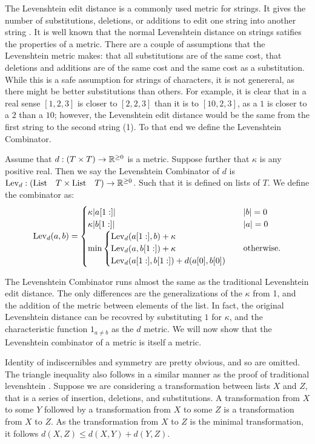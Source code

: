 The Levenshtein edit distance is a commonly used metric for strings.
It gives the number of substitutions, deletions, or additions to edit one string into another string \cite{wiki:levenshtein}.
It is well known that the normal Levenshtein distance on strings satifies the properties of a metric.
There are a couple of assumptions that the Levenshtein metric makes:
that all substitutions are of the same cost,
that deletions and additions are of the same cost and the same cost as a substitution.
While this is a safe assumption for strings of characters,
it is not genereral, as there might be better substitutions than others.
For example, 
it is clear that in a real sense $[1, 2, 3]$ is closer to $[2, 2, 3]$ than it is to $[10, 2, 3]$,
as a $1$ is closer to a $2$ than a $10$;
however, the Levenshtein edit distance would be the same from the first string to the second string (1).
To that end we define the Levenshtein Combinator.

\begin{definition}
Assume that $d : (T \times T) \to \mathbb{R}^{\ge 0}$ is a metric.
Suppose further that $\kappa$ is any positive real.
Then we say the Levenshtein Combinator of $d$ is  $\text{Lev}_{d} : (\text{List}\quad T \times \text{List}\quad T) \to \mathbb{R}^{\ge 0}$.
Such that it is defined on lists of $T$.
We define the combinator as: 
$$ \lev{d}(a, b) = \begin{cases} 
    \kappa | \tail{a} | & |b| = 0 \\
    \kappa | \tail{b} | & |a| = 0 \\ 
    \text{min} \begin{cases}
        \lev{d}(\tail{a}, b) + \kappa \\
        \lev{d}(a, \tail{b}) + \kappa \\
        \lev{d}(\tail{a}, \tail{b}) + d(\head{a}, \head{b})  %
    \end{cases} & \otw
\end{cases}$$
\end{definition}

The Levenshtein Combinator runs almost the same as the traditional Levenshtein edit distance.
The only differences are the generalizations of the $\kappa$ from 1,
and the addition of the metric between elements of the list.
In fact, the original Levenshtein distance can be recovred by substituting $1$ for $\kappa$,
and the characteristic function $1_{a \neq b}$ as the $d$ metric.
We will now show that the Levenshtein combinator of a metric is itself a metric. 

Identity of indiscernibles and symmetry are pretty obvious, and so are omitted.
The triangle inequality also follows in a similar manner as the proof of traditional levenshtein \cite{j2kun_2014}.
Suppose we are considering a transformation between lists $X$ and $Z$,
that is a series of insertion, deletions, and substitutions.
A transformation from $X$ to some $Y$ followed by a transformation from $X$ to some $Z$
is a transformation from $X$ to $Z$.
As the transformation from $X$ to $Z$ is the minimal transformation,
it follows $d(X, Z) \le d(X, Y) + d(Y, Z)$.